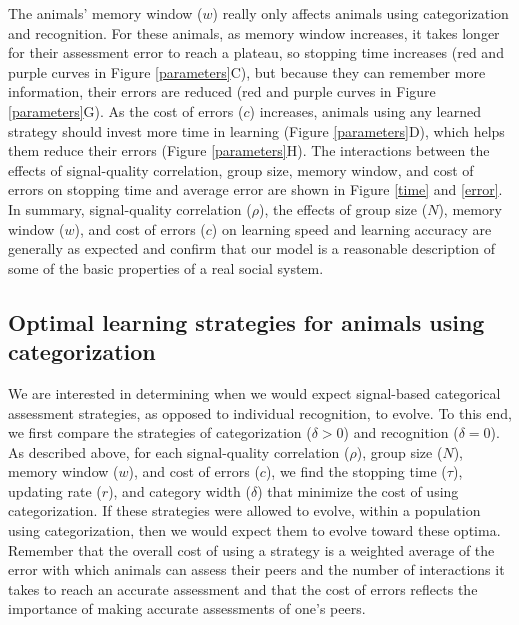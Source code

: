The animals' memory window ($w$) really only affects animals using categorization and recognition. For these animals, as memory window increases, it takes longer for their assessment error to reach a plateau, so stopping time increases (red and purple curves in Figure \ref{parameters}C), but because they can remember more information, their errors are reduced (red and purple curves in Figure \ref{parameters}G). As the cost of errors ($c$) increases, animals using any learned strategy should invest more time in learning (Figure \ref{parameters}D), which helps them reduce their errors (Figure \ref{parameters}H). The interactions between the effects of signal-quality correlation, group size, memory window, and cost of errors on stopping time and average error are shown in Figure \ref{time} and \ref{error}. In summary, signal-quality correlation ($\rho$), the effects of group size ($N$), memory window ($w$), and cost of errors ($c$) on learning speed and learning accuracy are generally as expected and confirm that our model is a reasonable description of some of the basic properties of a real social system. 
  
\subsection*{Optimal learning strategies for animals using categorization}
We are interested in determining when we would expect signal-based categorical assessment strategies, as opposed to individual recognition, to evolve. To this end, we first compare the strategies of categorization ($\delta>0$) and recognition ($\delta=0$). As described above, for each signal-quality correlation ($\rho$), group size ($N$), memory window ($w$), and cost of errors ($c$), we find the stopping time ($\tau$), updating rate ($r$), and category width ($\delta$) that minimize the cost of using categorization. If these strategies were allowed to evolve, within a population using categorization, then we would expect them to evolve toward these optima. Remember that the overall cost of using a strategy is a weighted average of the error with which animals can assess their peers and the number of interactions it takes to reach an accurate assessment and that the cost of errors reflects the importance of making accurate assessments of one's peers. 

